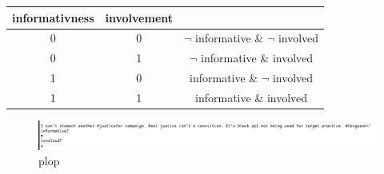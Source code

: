 \documentclass[a4paper,12pt]{report}
\begin{document}
\begin{center}
\begin{tabular}{ccc}
informativness & involvement & ~ \\ \hline
0 & 0 & $\neg$ informative \& $\neg$ involved \\ \hline
0 & 1 & $\neg$ informative \& involved \\ \hline
1 & 0 & informative \& $\neg$ involved \\ \hline
1 & 1 & informative \& involved \\ \hline
\end{tabular}
\end{center}

\begin{figure}[H]
\centering
\includegraphics[width=\textwidth]{images/screens/manual_label_screen.png}
\caption{plop}
\end{figure}

\newpage
\end{document}
